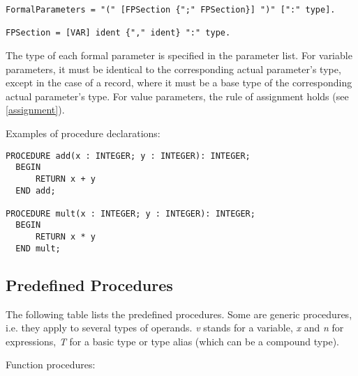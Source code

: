 \documentclass[12pt]{article}
\begin{document}
\begin{lstlisting}[style=ebnf]
FormalParameters = "(" [FPSection {";" FPSection}] ")" [":" type]. 

FPSection = [VAR] ident {"," ident} ":" type.
\end{lstlisting} 

The type of each formal parameter is specified in the parameter list. For variable parameters, it must be identical to the corresponding actual parameter's type, except in the case of a record, where it must be a base type of the corresponding actual parameter's type. For value parameters, the rule of assignment holds (see \ref{assignment}).

Examples of procedure declarations:

\begin{lstlisting}[style=example]
PROCEDURE add(x : INTEGER; y : INTEGER): INTEGER;
  BEGIN
      RETURN x + y
  END add;

PROCEDURE mult(x : INTEGER; y : INTEGER): INTEGER;
  BEGIN
      RETURN x * y
  END mult;
\end{lstlisting} 

\subsection{Predefined Procedures}
\label{predefined}
The following table lists the predefined procedures. Some are generic procedures, i.e. they apply to several types of operands.
\emph{v} stands for a variable, \emph{x} and \emph{n} for expressions, \emph{T} for a basic type or type alias (which can be a compound type).

Function procedures:
\end{document}

